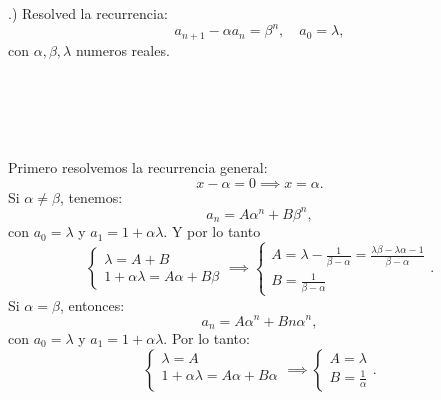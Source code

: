 \documentclass{article}
\begin{document}
.) Resolved la recurrencia:
\[
a_{n+1} - \alpha a_n = \beta^n, \quad a_0 = \lambda,
\]
con $\alpha,\beta, \lambda$ numeros reales.
\\ \\ \\ \\ \\ \\
Primero resolvemos la recurrencia general:
\[
x - \alpha = 0 \implies x = \alpha.
\]
Si $\alpha \neq \beta$, tenemos:
\[
a_n = A \alpha^n + B\beta^n,
\]
con $a_0 = \lambda$ y $a_1 = 1 + \alpha\lambda$. Y por lo tanto
\[
\begin{cases}
\lambda = A + B \\
1 + \alpha\lambda = A\alpha + B\beta
\end{cases}
\implies
\begin{cases}
A = \lambda - \frac{1}{\beta - \alpha} = \frac{\lambda\beta - \lambda\alpha - 1}{\beta - \alpha} \\
B = \frac{1}{\beta - \alpha}
\end{cases}.
\]
Si $\alpha = \beta$, entonces:
\[
a_n = A\alpha^n + Bn\alpha^n,
\]
con $a_0 = \lambda$ y $a_1 = 1 + \alpha\lambda$.
Por lo tanto:
\[
\begin{cases}
\lambda = A \\
1 + \alpha\lambda = A\alpha + B\alpha \\
\end{cases}
\implies
\begin{cases}
A = \lambda \\
B = \frac{1}{\alpha}
\end{cases}.
\]
\end{document}
